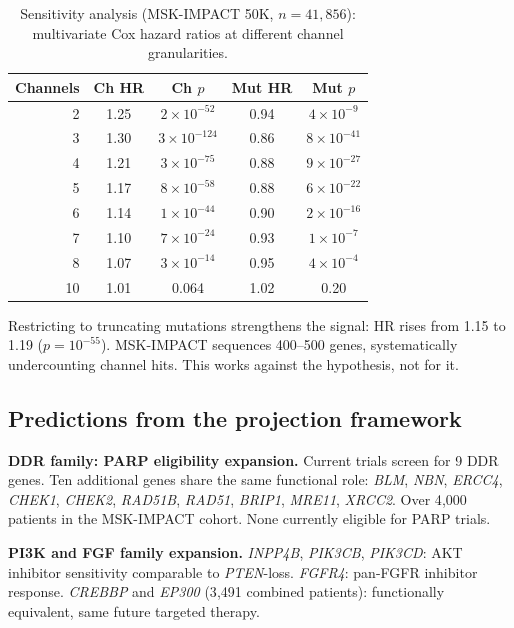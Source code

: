 \documentclass[11pt]{article}
\begin{document}
\begin{table}[ht]
\centering
\caption{Sensitivity analysis (MSK-IMPACT 50K, $n = 41{,}856$):
multivariate Cox hazard ratios at different channel granularities.}
\label{tab:sensitivity}
\medskip
\begin{tabular*}{\textwidth}{@{\extracolsep{\fill}}rcccc@{}}
\toprule
Channels & Ch HR & Ch $p$ & Mut HR & Mut $p$ \\
\midrule
2 & 1.25 & $2 \times 10^{-52}$ & 0.94 & $4 \times 10^{-9}$ \\
3 & 1.30 & $3 \times 10^{-124}$ & 0.86 & $8 \times 10^{-41}$ \\
4 & 1.21 & $3 \times 10^{-75}$ & 0.88 & $9 \times 10^{-27}$ \\
5 & 1.17 & $8 \times 10^{-58}$ & 0.88 & $6 \times 10^{-22}$ \\
6 & 1.14 & $1 \times 10^{-44}$ & 0.90 & $2 \times 10^{-16}$ \\
7 & 1.10 & $7 \times 10^{-24}$ & 0.93 & $1 \times 10^{-7}$ \\
8 & 1.07 & $3 \times 10^{-14}$ & 0.95 & $4 \times 10^{-4}$ \\
10 & 1.01 & 0.064 & 1.02 & 0.20 \\
\bottomrule
\end{tabular*}
\end{table}

Restricting to truncating mutations strengthens the signal:
HR rises from 1.15 to 1.19 ($p = 10^{-55}$). MSK-IMPACT sequences
400--500 genes, systematically undercounting channel hits. This works
against the hypothesis, not for it.

\subsection*{Predictions from the projection framework}

\textbf{DDR family: PARP eligibility expansion.}
Current trials screen for 9 DDR genes. Ten additional genes share
the same functional role: \emph{BLM}, \emph{NBN}, \emph{ERCC4},
\emph{CHEK1}, \emph{CHEK2}, \emph{RAD51B}, \emph{RAD51},
\emph{BRIP1}, \emph{MRE11}, \emph{XRCC2}. Over 4{,}000 patients in
the MSK-IMPACT cohort. None currently eligible for PARP trials.

\textbf{PI3K and FGF family expansion.} \emph{INPP4B},
\emph{PIK3CB}, \emph{PIK3CD}: AKT inhibitor sensitivity comparable
to \emph{PTEN}-loss. \emph{FGFR4}: pan-FGFR inhibitor response.
\emph{CREBBP} and \emph{EP300} (3{,}491 combined patients):
functionally equivalent, same future targeted therapy.
\end{document}
